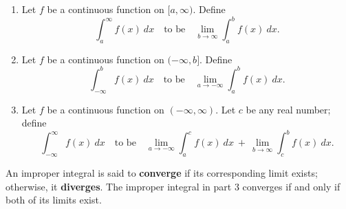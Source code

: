 {\begin{enumerate}
\item		Let $f$ be a continuous function on $[a,\infty)$. Define 
$$\int_a^\infty f(x)\ dx \quad \text{to be}\quad \lim_{b\to\infty}\int_a^b f(x)\ dx.$$

\item		Let $f$ be a continuous function on $(-\infty,b]$. Define
$$\int_{-\infty}^b f(x)\ dx \quad \text{to be}\quad \lim_{a\to-\infty}\int_a^b f(x)\ dx.$$

\item		Let $f$ be a continuous function on $(-\infty,\infty)$. Let $c$ be any real number; define
$$\int_{-\infty}^\infty f(x)\ dx \quad \text{to be}\quad \lim_{a\to-\infty}\int_a^c f(x)\ dx\ +\ \lim_{b\to\infty}\int_c^b f(x)\ dx.$$
\end{enumerate}
An improper integral is said to \textbf{converge} if its corresponding limit exists; otherwise, it \textbf{diverges}. The improper integral in part 3 converges if and only if both of its limits exist.
}
\enlargethispage{2\baselineskip}

